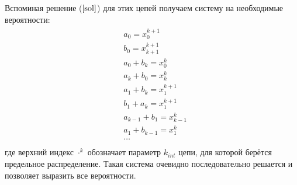 Вспоминая решение ($\ref{sol}$) для этих цепей получаем систему на необходимые вероятности:
\begin{align}
	\begin{split}
	\label{general}
	&a_0 = x^{k+1}_0\\
	&b_0 = x^{k+1}_{k+1}\\
	&a_0 + b_{k}= x^{k}_0\\
	&a_k + b_0 = x^k_k \\
	&a_1 + b_k = x^{k+1}_1\\
	&b_1 + a_k = x^{k+1}_1\\
	&a_{k-1} + b_1 = x^k_{k-1}\\
	&a_1+ b_{k-1} = x^k_{1}\\
	&\dots \\
	\end{split}
\end{align}
где верхний индекс $\cdot^k$ обозначает параметр $k_{int}$ цепи, для которой берётся предельное распределение. Такая система очевидно последовательно решается и позволяет выразить все вероятности.

